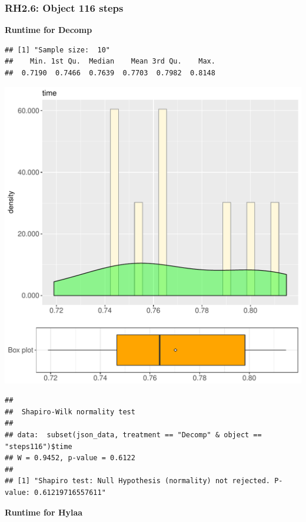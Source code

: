 \documentclass{article}\usepackage[]{graphicx}\usepackage[]{color}
\makeatletter
\def\maxwidth{ %
  \ifdim\Gin@nat@width>\linewidth
    \linewidth
  \else
    \Gin@nat@width
  \fi
}
\newenvironment{kframe}{%
 \def\at@end@of@kframe{}%
 \ifinner\ifhmode%
  \def\at@end@of@kframe{\end{minipage}}%
  \begin{minipage}{\columnwidth}%
 \fi\fi%
 \def\FrameCommand##1{\hskip\@totalleftmargin \hskip-\fboxsep
 \colorbox{shadecolor}{##1}\hskip-\fboxsep
     \hskip-\linewidth \hskip-\@totalleftmargin \hskip\columnwidth}%
 \MakeFramed {\advance\hsize-\width
   \@totalleftmargin\z@ \linewidth\hsize
   \@setminipage}}%
 {\par\unskip\endMakeFramed%
 \at@end@of@kframe}
\newenvironment{knitrout}{}{} %
\makeatother
\begin{document}
\subsubsection{RH2.6: Object 116 steps}

 \textbf{Runtime for Decomp}
\begin{knitrout}
\color{fgcolor}\begin{kframe}
\begin{verbatim}
## [1] "Sample size:  10"
##    Min. 1st Qu.  Median    Mean 3rd Qu.    Max. 
##  0.7190  0.7466  0.7639  0.7703  0.7982  0.8148
\end{verbatim}
\end{kframe}
\includegraphics[width=\maxwidth]{figure/RH2_Decomp_steps116-1} 
\begin{kframe}\begin{verbatim}
## 
## 	Shapiro-Wilk normality test
## 
## data:  subset(json_data, treatment == "Decomp" & object == "steps116")$time
## W = 0.9452, p-value = 0.6122
## 
## [1] "Shapiro test: Null Hypothesis (normality) not rejected. P-value: 0.61219716557611"
\end{verbatim}
\end{kframe}
\end{knitrout}
 \textbf{Runtime for Hylaa}
\end{document}
